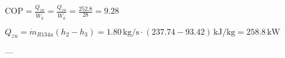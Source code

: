\( \text{COP} = \frac{Q_{zu}}{\dot{W}_k} = \frac{Q_{zu}}{\dot{W}_k} = \frac{252.8}{28} = 9.28 \)  

\( Q_{zu} = \dot{m}_{R134a}(h_2 - h_3) = 1.80 \, \text{kg/s} \cdot (237.74 - 93.42) \, \text{kJ/kg} = 258.8 \, \text{kW} \)  

---